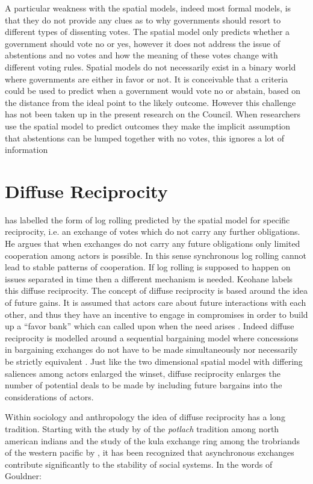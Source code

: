A particular weakness with the spatial models, indeed most formal models, is that they do not provide any clues as to why governments should resort to different types of dissenting votes. The spatial model only predicts whether a government should vote no or yes, however it does not address the issue of abstentions and no votes and how the meaning of these votes change with different voting rules. Spatial models do not necessarily exist in a binary world where governments are either in favor or not. It is conceivable that a criteria could be used to predict when a government would vote no or abstain, based on the distance from the ideal point to the likely outcome. However this challenge has not been taken up in the present research on the Council. When researchers use the spatial model to predict outcomes they make the implicit assumption that abstentions can be lumped together with no votes, this ignores a lot of information  

\section{Diffuse Reciprocity}

\citet{Keohane1986} has labelled the form of log rolling predicted  by the spatial model for specific reciprocity, i.e. an exchange of votes which do not carry any further obligations. He argues that when exchanges do not carry any future obligations only limited cooperation among actors is possible. In this sense synchronous log rolling cannot lead to stable patterns of cooperation. If log rolling is supposed to happen on issues separated in time then a different mechanism is needed. Keohane labels this diffuse reciprocity. The concept of diffuse reciprocity is based around the idea of future gains. It is assumed that actors care about future interactions with each other, and thus they have an incentive to engage in compromises in order to build up a ``favor bank'' which can called upon when the need arises \citep{Heisenberg2005}. Indeed diffuse reciprocity is modelled around a sequential bargaining model where concessions in bargaining exchanges do not have to be made simultaneously nor necessarily be strictly equivalent \citep{Jonsson2000}.  Just like the two dimensional spatial model with differing saliences among actors enlarged the winset, diffuse reciprocity enlarges the number of potential deals to be made by including future bargains into the considerations of actors. 

Within sociology and anthropology the idea of diffuse reciprocity has a long tradition. Starting with the study by \citet{Mauss1950} of the \textsl{potlach} tradition among north american indians and the study of the kula exchange ring among the trobriands of the western pacific by \citet{Malinowski1922}, it has been recognized that asynchronous exchanges contribute significantly to the stability of social systems. In the words of Gouldner:

